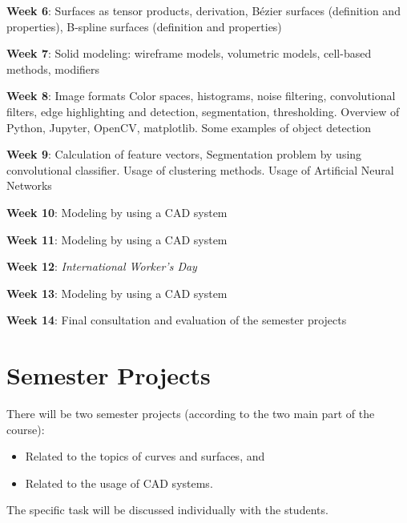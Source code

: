 \documentclass[a4paper,12pt]{article}
\begin{document}
\bigskip

\noindent \textbf{Week 6}:
Surfaces as tensor products, derivation, Bézier surfaces (definition and properties), B-spline surfaces (definition and properties)

\bigskip

\noindent \textbf{Week 7}:
Solid modeling: wireframe models, volumetric models, cell-based methods, modifiers

\bigskip

\noindent \textbf{Week 8}:
Image formats Color spaces, histograms, noise filtering, convolutional filters, edge highlighting and detection, segmentation, thresholding. Overview of Python, Jupyter, OpenCV, matplotlib. Some examples of object detection

\bigskip

\noindent \textbf{Week 9}:
Calculation of feature vectors, Segmentation problem by using convolutional classifier. Usage of clustering methods. Usage of Artificial Neural Networks

\bigskip

\noindent \textbf{Week 10}:
Modeling by using a CAD system

\bigskip

\noindent \textbf{Week 11}:
Modeling by using a CAD system

\bigskip

\noindent \textbf{Week 12}:
\textit{International Worker's Day}

\bigskip

\noindent \textbf{Week 13}:
Modeling by using a CAD system

\bigskip

\noindent \textbf{Week 14}:
Final consultation and evaluation of the semester projects

\section{Semester Projects}

There will be two semester projects (according to the two main part of the course):

\begin{itemize}
	\item Related to the topics of curves and surfaces, and
	\item Related to the usage of CAD systems.
\end{itemize}

\noindent The specific task will be discussed individually with the students.
\end{document}
